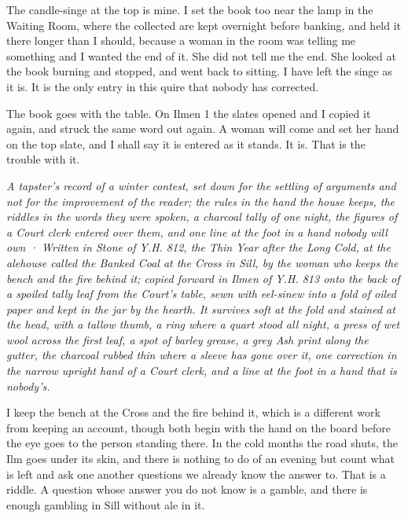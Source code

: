 \documentclass{design/chronicle}
\begin{document}
The candle-singe at the top is mine. I set the book too near the lamp in the Waiting Room, where the collected are kept overnight before banking, and held it there longer than I should, because a woman in the room was telling me something and I wanted the end of it. She did not tell me the end. She looked at the book burning and stopped, and went back to sitting. I have left the singe as it is. It is the only entry in this quire that nobody has corrected.

The book goes with the table. On Ilmen 1 the slates opened and I copied it again, and struck the same word out again. A woman will come and set her hand on the top slate, and I shall say it is entered as it stands. It is. That is the trouble with it.

\clearpage{}
{\centering\FellFont\itshape\footnotesize\color{faded} A tapster’s record of a winter contest, set down for the settling of arguments and not for the improvement of the reader; the rules in the hand the house keeps, the riddles in the words they were spoken, a charcoal tally of one night, the figures of a Court clerk entered over them, and one line at the foot in a hand nobody will own · Written in Stone of Y.H. 812, the Thin Year after the Long Cold, at the alehouse called the Banked Coal at the Cross in Sill, by the woman who keeps the bench and the fire behind it; copied forward in Ilmen of Y.H. 813 onto the back of a spoiled tally leaf from the Court’s table, sewn with eel-sinew into a fold of oiled paper and kept in the jar by the hearth. It survives soft at the fold and stained at the head, with a tallow thumb, a ring where a quart stood all night, a press of wet wool across the first leaf, a spot of barley grease, a grey Ash print along the gutter, the charcoal rubbed thin where a sleeve has gone over it, one correction in the narrow upright hand of a Court clerk, and a line at the foot in a hand that is nobody’s.\par}\medskip
I keep the bench at the Cross and the fire behind it, which is a different work from keeping an account, though both begin with the hand on the board before the eye goes to the person standing there. In the cold months the road shuts, the Ilm goes under its skin, and there is nothing to do of an evening but count what is left and ask one another questions we already know the answer to. That is a riddle. A question whose answer you do not know is a gamble, and there is enough gambling in Sill without ale in it.
\end{document}
